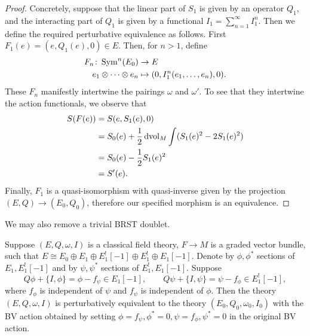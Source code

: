 \documentclass[10pt, oneside]{article}
\begin{document}
\begin{proof}
Concretely, suppose that the linear part of $S_1$ is given by an operator $Q_1$, and the interacting part of $Q_1$ is given by a functional $I_1 = \sum_{n=1}^\infty I_1^n$.  Then we define the required perturbative equivalence as follows.  First $F_1(e) = (e, Q_1(e), 0) \in E$.  Then, for $n > 1$, define
\begin{align*}
F_n \colon \operatorname{Sym}^n(E_0) &\to E \\
e_1 \otimes \cdots \otimes e_n &\mapsto (0, I_1^n(e_1, \ldots, e_n), 0).
\end{align*}
These $F_n$ manifestly intertwine the pairings $\omega$ and $\omega'$.  To see that they intertwine the action functionals, we observe that 
\begin{align*}
S(F(e)) &= S(e, S_1(e), 0) \\
&= S_0(e) + \frac 12 \operatorname{dvol}_M \int (S_1(e)^2 - 2 S_1(e)^2) \\
&= S_0(e) - \frac 12 S_1(e)^2 \\
&= S'(e).
\end{align*}
Finally, $F_1$ is a quasi-isomorphism with quasi-inverse given by the projection $(E,Q) \to (E_0,Q_0)$, therefore our specified morphism is an equivalence.
\end{proof}

We may also remove a trivial BRST doublet.

\begin{prop}
Suppose $(E, Q, \omega, I)$ is a classical field theory, $F\rightarrow M$ is a graded vector bundle, such that $E\cong E_0\oplus E_1\oplus E_1^![-1]\oplus E_1^!\oplus E_1[-1]$. Denote by $\phi, \phi^*$ sections of $E_1,E_1^![-1]$ and by $\psi, \psi^*$ sections of $E_1^!, E_1[-1]$. Suppose
\[Q\phi + \{I, \phi\} = \phi - f_\psi \in E_1[-1] ,\qquad Q\psi + \{I, \psi\} = \psi - f_{\phi} \in E_1^![-1],\]
where $f_\phi$ is independent of $\psi$ and $f_{\psi}$ is independent of $\phi$. Then the theory $(E, Q, \omega, I)$ is perturbatively equivalent to the theory $(E_0, Q_0, \omega_0, I_0)$ with the BV action obtained by setting $\phi = f_\psi, \phi^* = 0,  \psi = f_\phi, \psi^* = 0$ in the original BV action.
\label{prop:BRSTdoublet}
\end{prop}
\end{document}
